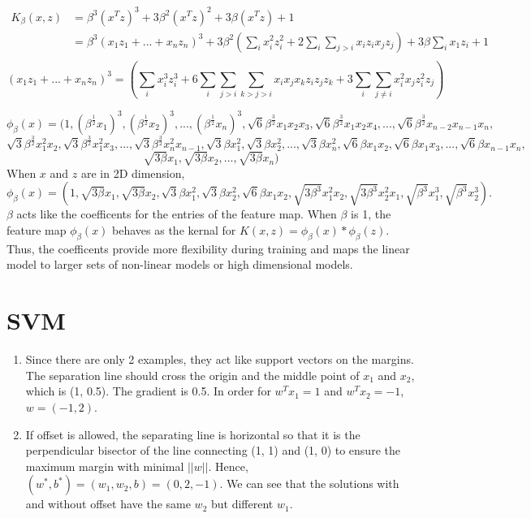 \documentclass[11pt]{article}
\begin{document}
\begin{equation*}
    \begin{split}
        K_{\beta}(x,z)
        & = \beta^3 (x^Tz)^3 + 3\beta^2 (x^Tz)^2 + 3\beta (x^Tz) + 1\\
        & = \beta^3 (x_1z_1 + ... + x_nz_n)^3 + 3\beta^2 \left(\sum_i{x_i^2z_i^2} + 2\sum_i\sum_{j>i}{x_iz_ix_jz_j} \right) + 3\beta\sum_i{x_1z_i} + 1\\
    \end{split}
\end{equation*}
$$(x_1z_1 + ... + x_nz_n)^3 = \left(\sum_ix_i^3z_i^3 + 6\sum_i\sum_{j>i}\sum_{k>j>i}{x_ix_jx_kz_iz_jz_k} + 3\sum_i\sum_{j\neq i}x_i^2x_jz_i^2z_j  \right)$$

$$\phi_\beta(x) = (1, (\beta^{\frac{1}{2}} x_1)^3, (\beta^{\frac{1}{2}} x_2)^3, ..., (\beta^{\frac{1}{2}} x_n)^3, \sqrt{6} \beta^{\frac{3}{2}}x_1x_2x_3, \sqrt{6} \beta^{\frac{3}{2}}x_1x_2x_4, ..., \sqrt{6} \beta^{\frac{3}{2}}x_{n-2}x_{n-1}x_{n}, $$
$$\sqrt{3}\beta^{\frac{3}{2}}x_1^2x_2, \sqrt{3}\beta^{\frac{3}{2}}x_1^2x_3, ..., \sqrt{3}\beta^{\frac{3}{2}}x_n^2x_{n-1}, \sqrt{3}\beta x_1^2, \sqrt{3}\beta x_2^2, ..., \sqrt{3}\beta x_n^2, \sqrt{6}\beta x_1x_2, \sqrt{6}\beta x_1x_3, ..., \sqrt{6}\beta x_{n-1}x_{n},$$ 
$$\sqrt{3\beta} x_1, \sqrt{3\beta} x_2, ..., \sqrt{3\beta} x_n)$$
When $x$ and $z$ are in 2D dimension, 
$$\phi_\beta(x) = (1, \sqrt{3\beta}x_1, \sqrt{3\beta}x_2, \sqrt{3}\beta x_1^2, \sqrt{3}\beta x_2^2, \sqrt{6}\beta x_1x_2, \sqrt{3\beta^{3}}x_1^2x_2, \sqrt{3\beta^{3}}x_2^2x_1, \sqrt{\beta^3}x_1^3, \sqrt{\beta^3}x_2^3).$$
$\beta$ acts like the coefficents for the entries of the feature map. When $\beta$ is 1, the feature map $\phi_\beta(x)$ behaves as the kernal for $K(x, z) = \phi_\beta(x)*\phi_\beta(z)$. Thus, the coefficents provide more flexibility during training and maps the linear model to larger sets of non-linear models or high dimensional models.


\section{SVM}
\begin{enumerate}[label=(\alph*)]
\item 
    Since there are only 2 examples, they act like support vectors on the margins. The separation line should cross the origin and the middle point of $x_1$ and $x_2$, which is (1, 0.5). The gradient is 0.5. In order for $w^Tx_1 = 1$ and $w^Tx_2 = -1$, $w = (-1, 2)$.

\item 
    If offset is allowed, the separating line is horizontal so that it is the perpendicular bisector of the line connecting (1, 1) and (1, 0) to ensure the maximum margin with minimal $||w||$. Hence, $(w^*, b^*) = (w_1, w_2, b) = (0, 2, -1)$. We can see that the solutions with and without offset have the same $w_2$ but different $w_1$.

\end{enumerate}
\end{document}
